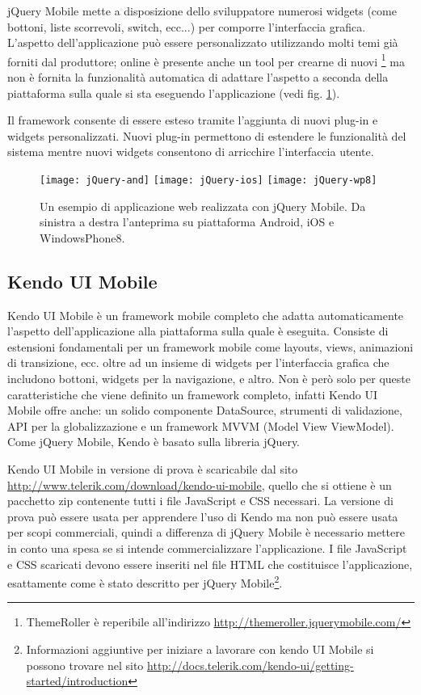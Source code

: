 			jQuery Mobile mette a disposizione dello sviluppatore numerosi
			widgets (come bottoni, liste scorrevoli, switch, ecc...) per
			comporre l'interfaccia grafica. L'aspetto dell'applicazione può
			essere personalizzato utilizzando molti temi già forniti dal
			produttore; online è presente anche un tool per crearne di nuovi
			\footnote{ThemeRoller è reperibile all'indirizzo
			\url{http://themeroller.jquerymobile.com/}} ma non è fornita la
			funzionalità automatica di adattare l'aspetto a seconda della
			piattaforma sulla quale si sta eseguendo l'applicazione (vedi fig.
			\ref{fig:jquery}).
			
			Il framework consente di essere esteso tramite l'aggiunta di nuovi
			plug-in e widgets personalizzati. Nuovi plug-in permettono di
			estendere le funzionalità del sistema mentre nuovi widgets
			consentono di arricchire l'interfaccia utente.
			\begin{figure}[h]
				\centering
				\texttt{[image: jQuery-and]}
				\texttt{[image: jQuery-ios]}
				\texttt{[image: jQuery-wp8]}
				\caption{
					Un esempio di applicazione web realizzata con jQuery Mobile.
					Da sinistra a destra l'anteprima su piattaforma Android, iOS
					e WindowsPhone8.
				}
				\label{fig:jquery}
			\end{figure}
	
		\subsection{Kendo UI Mobile}
			Kendo UI Mobile è un framework mobile completo che adatta automaticamente
			l'aspetto dell'applicazione alla piattaforma sulla quale è eseguita.
			Consiste di estensioni fondamentali per un framework
			mobile come layouts, views, animazioni di transizione, ecc. 
			oltre ad un insieme di widgets per
			l'interfaccia grafica che includono bottoni, widgets per la navigazione,
			e altro. Non è però solo per queste caratteristiche che viene 
			definito un framework completo, infatti Kendo UI Mobile offre anche:
			un solido componente DataSource, strumenti di validazione, 
			API per la globalizzazione e un framework MVVM (Model View ViewModel). 
			Come jQuery Mobile, Kendo è basato sulla libreria jQuery.
			
			Kendo UI Mobile in versione di prova è scaricabile dal sito 
			\url{http://www.telerik.com/download/kendo-ui-mobile}, quello che si 
			ottiene è un pacchetto zip contenente tutti i file JavaScript e CSS 
			necessari. La versione di prova
			può essere usata per apprendere l'uso di Kendo ma non può essere usata 
			per scopi commerciali, quindi a differenza di jQuery Mobile è necessario 
			mettere in conto una spesa se si intende commercializzare l'applicazione.
			I file JavaScript e CSS scaricati devono essere inseriti nel file HTML
			che costituisce l'applicazione, esattamente come è stato descritto per 
			jQuery Mobile\footnote{Informazioni aggiuntive per iniziare a 
			lavorare con kendo UI Mobile si possono trovare nel sito 
			\url{http://docs.telerik.com/kendo-ui/getting-started/introduction}}.
			
